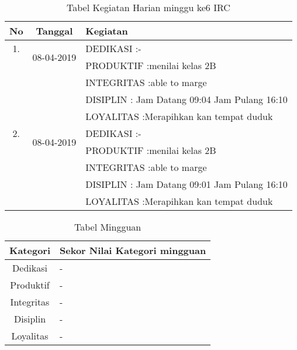 \begin{table}[h]
\caption{Tabel Kegiatan Harian minggu ke6 IRC}
\centering
\begin{tabular}{|c|c|l|}
\hline
No&Tanggal&Kegiatan\\
\hline
1.&\multirow{2}{*}{08-04-2019}
&DEDIKASI :-\\
&&PRODUKTIF :menilai kelas 2B\\
&&INTEGRITAS :able to marge\\
&&DISIPLIN : Jam Datang 09:04 Jam Pulang 16:10\\
&&LOYALITAS :Merapihkan kan tempat duduk\\
\hline
2.&\multirow{2}{*}{08-04-2019}
&DEDIKASI :-\\
&&PRODUKTIF :menilai kelas 2B\\
&&INTEGRITAS :able to marge\\
&&DISIPLIN : Jam Datang 09:01 Jam Pulang 16:10\\
&&LOYALITAS :Merapihkan kan tempat duduk\\
\hline
\end{tabular}
\label{table:contoh}
\end{table}

\begin{table}[h]
\begin{center}
\caption{Tabel Mingguan}
\begin{tabular}{|c|l|}
\hline
Kategori& Sekor Nilai Kategori mingguan\\
\hline
Dedikasi & -\\
\hline
Produktif & -\\
\hline
Integritas & -\\
\hline
Disiplin & -\\
\hline
Loyalitas & -\\
\hline
\end{tabular}
\end{center}
\label {Tabel:contoh} 
\end{table}